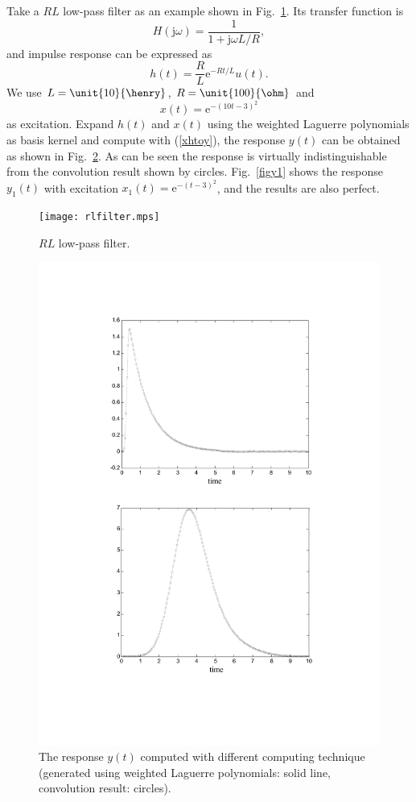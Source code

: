 \documentclass[conference, a4paper]{IEEEtran}
\begin{document}
Take a $RL$ low-pass filter as an example shown in Fig.~\ref{rlfilter}.
Its transfer function is
\begin{equation}
H(\mathrm{j}\omega)=\frac{1}{1+\mathrm{j}\omega L/R},
\end{equation}
and impulse response can be expressed as
\begin{equation}
h(t)=\frac{R}{L}\mathrm{e}^{-Rt/L}u(t).
\end{equation}
We use $L=\unit{10}{\henry}$, $R=\unit{100}{\ohm}$ and
\begin{equation}
x(t)=\mathrm{e}^{-(10t-3)^2}
\end{equation}
as excitation. Expand $h(t)$ and $x(t)$ using the weighted Laguerre
polynomials as basis kernel and compute with (\ref{xhtoy}), the response
$y(t)$ can be obtained as shown in Fig.~\ref{figy}. As can be seen the
response is virtually indistinguishable from the convolution result
shown by circles. Fig.~\ref{figy1} shows the response $y_1(t)$ with excitation
$x_1(t)=\mathrm{e}^{-(t-3)^2}$, and the results are also perfect.
\begin{figure}
    \centering
    \texttt{[image: rlfilter.mps]}
    \caption{$RL$ low-pass filter.}
    \label{rlfilter}
\end{figure}
\begin{figure}
    \centering
    \includegraphics[scale=.5]{fig4.pdf}
    \caption{The response $y(t)$ computed with different computing
    technique (generated using weighted Laguerre polynomials: solid
    line, convolution result: circles).}
    \label{figy}
\end{figure}
\end{document}
